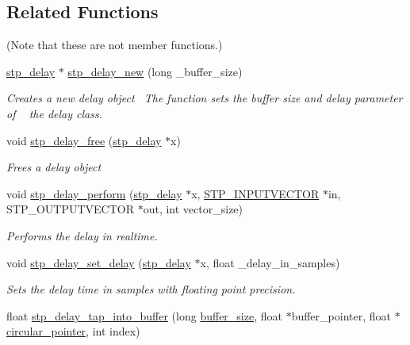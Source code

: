 \subsection*{Related Functions}
(Note that these are not member functions.) \begin{DoxyCompactItemize}
\item 
\hyperlink{structstp__delay}{stp\+\_\+delay} $\ast$ \hyperlink{structstp__delay_a3a73c0ad8f9e2b75658e2caa0f953be5}{stp\+\_\+delay\+\_\+new} (long \+\_\+buffer\+\_\+size)
\begin{DoxyCompactList}\small\item\em Creates a new delay object~\newline
 The function sets the buffer size and delay parameter of ~\newline
 the delay class. \end{DoxyCompactList}\item 
void \hyperlink{structstp__delay_a59f19a499544509b42b44a66bb3cc4da}{stp\+\_\+delay\+\_\+free} (\hyperlink{structstp__delay}{stp\+\_\+delay} $\ast$x)
\begin{DoxyCompactList}\small\item\em Frees a delay object~\newline
 \end{DoxyCompactList}\item 
void \hyperlink{structstp__delay_a205e835f977cc00c091e448946719ef9}{stp\+\_\+delay\+\_\+perform} (\hyperlink{structstp__delay}{stp\+\_\+delay} $\ast$x, \hyperlink{stp__defines_8h_a142134bffa517ce86ebf0bdcdbe975d2}{S\+T\+P\+\_\+\+I\+N\+P\+U\+T\+V\+E\+C\+T\+OR} $\ast$in, S\+T\+P\+\_\+\+O\+U\+T\+P\+U\+T\+V\+E\+C\+T\+OR $\ast$out, int vector\+\_\+size)
\begin{DoxyCompactList}\small\item\em Performs the delay in realtime. ~\newline
 \end{DoxyCompactList}\item 
void \hyperlink{structstp__delay_a0c9d0cc22a2fa7c0efed1d2eceafe9b9}{stp\+\_\+delay\+\_\+set\+\_\+delay} (\hyperlink{structstp__delay}{stp\+\_\+delay} $\ast$x, float \+\_\+delay\+\_\+in\+\_\+samples)
\begin{DoxyCompactList}\small\item\em Sets the delay time in samples with floating point precision. ~\newline
 \end{DoxyCompactList}\item 
float \hyperlink{structstp__delay_a26d9061428adafc706946d8c63452f84}{stp\+\_\+delay\+\_\+tap\+\_\+into\+\_\+buffer} (long \hyperlink{structstp__delay_ac0b5d1ec75d16c57ad6376f09c9693ca}{buffer\+\_\+size}, float $\ast$buffer\+\_\+pointer, float $\ast$\hyperlink{structstp__delay_a8ae11daccf5b56bb5a49c9a99956d23a}{circular\+\_\+pointer}, int index)

\end{DoxyCompactItemize}
